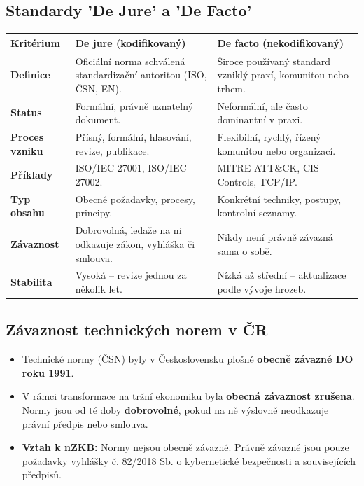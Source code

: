 \documentclass[10pt,a4paper]{article}
\begin{document}
	\subsection{Standardy 'De Jure' a 'De Facto'}
	\begin{center}
		\small
		\begin{tabular}{|l|p{6.5cm}|p{6.5cm}|}
			\hline
			\textbf{Kritérium} & \textbf{De jure (kodifikovaný)} & \textbf{De facto (nekodifikovaný)} \\ \hline
			\textbf{Definice} & Oficiální norma schválená standardizační autoritou (ISO, ČSN, EN). & Široce používaný standard vzniklý praxí, komunitou nebo trhem. \\ \hline
			\textbf{Status} & Formální, právně uznatelný dokument. & Neformální, ale často dominantní v praxi. \\ \hline
			\textbf{Proces vzniku} & Přísný, formální, hlasování, revize, publikace. & Flexibilní, rychlý, řízený komunitou nebo organizací. \\ \hline
			\textbf{Příklady} & ISO/IEC 27001, ISO/IEC 27002. & MITRE ATT\&CK, CIS Controls, TCP/IP. \\ \hline
			\textbf{Typ obsahu} & Obecné požadavky, procesy, principy. & Konkrétní techniky, postupy, kontrolní seznamy. \\ \hline
			\textbf{Závaznost} & Dobrovolná, ledaže na ni odkazuje zákon, vyhláška či smlouva. & Nikdy není právně závazná sama o sobě. \\ \hline
			\textbf{Stabilita} & Vysoká – revize jednou za několik let. & Nízká až střední – aktualizace podle vývoje hrozeb. \\ \hline
		\end{tabular}
	\end{center}
	
	\subsection{Závaznost technických norem v ČR}
	\begin{itemize}
		\item Technické normy (ČSN) byly v Československu plošně \textbf{obecně závazné DO roku 1991}.
		\item V rámci transformace na tržní ekonomiku byla \textbf{obecná závaznost zrušena}. Normy jsou od té doby \textbf{dobrovolné}, pokud na ně výslovně neodkazuje právní předpis nebo smlouva.
		\item \textbf{Vztah k nZKB:} Normy nejsou obecně závazné. Právně závazné jsou pouze požadavky vyhlášky č. 82/2018 Sb. o kybernetické bezpečnosti a souvisejících předpisů.
	\end{itemize}
	
\end{document}
